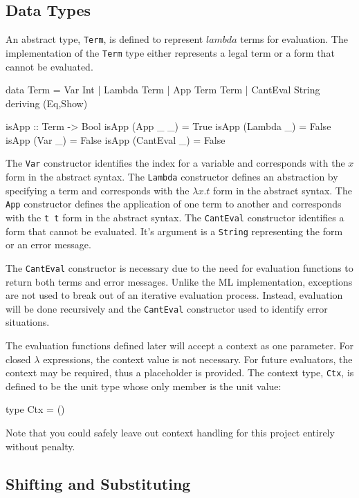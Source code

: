 \documentclass[10pt]{article}
\begin{document}
\subsection{Data Types}

An abstract type, \texttt{Term}, is defined to represent $lambda$
terms for evaluation.  The implementation of the \texttt{Term} type
either represents a legal term or a form that cannot be evaluated.

\begin{code}
  data Term = 
      Var Int |
      Lambda Term |
      App Term Term |
      CantEval String
      deriving (Eq,Show)

  isApp :: Term -> Bool
  isApp (App _ _) = True
  isApp (Lambda _) = False
  isApp (Var _) = False
  isApp (CantEval _) = False
\end{code}

The \texttt{Var} constructor identifies the index for a variable and
corresponds with the $x$ form in the abstract syntax.  The
\texttt{Lambda} constructor defines an abstraction by specifying a
term and corresponds with the $\lambda x.t$ form in the abstract
syntax.  The \texttt{App} constructor defines the application of one
term to another and corresponds with the \texttt{t t} form in the
abstract syntax.  The \texttt{CantEval} constructor identifies a form
that cannot be evaluated.  It's argument is a \texttt{String}
representing the form or an error message.

The \texttt{CantEval} constructor is necessary due to the need for
evaluation functions to return both terms and error messages.  Unlike
the ML implementation, exceptions are not used to break out of an
iterative evaluation process.  Instead, evaluation will be done
recursively and the \texttt{CantEval} constructor used to identify
error situations.

The evaluation functions defined later will accept a context as one
parameter.  For closed $\lambda$ expressions, the context value is not
necessary.  For future evaluators, the context may be required, thus a
placeholder is provided.  The context type, \texttt{Ctx}, is defined
to be the unit type whose only member is the unit value:

\begin{code}
  type Ctx = ()
\end{code}

Note that you could safely leave out context handling for this project
entirely without penalty.

\subsection{Shifting and Substituting}
\end{document}
